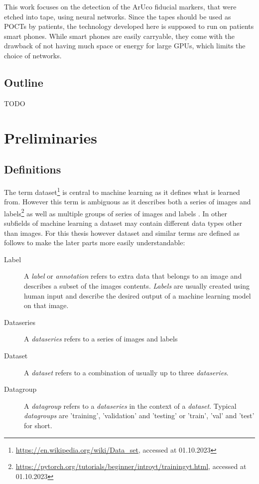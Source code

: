 \documentclass[10pt]{book}
\begin{document}
This work focuses on the detection of the \ac{ArUco} fiducial markers, that were etched into tape, using neural networks. Since the tapes should be used as \acp{POCT} by patients, the technology developed here is supposed to run on patients smart phones. While smart phones are easily carryable, they come with the drawback of not having much space or energy for large \acp{GPU}, which limits the choice of networks.

\section{Outline}

TODO

\chapter{Preliminaries}
\label{chap:prelim}

\section{Definitions}

The term dataset\footnote{\url{https://en.wikipedia.org/wiki/Data_set}, accessed at 01.10.2023} is central to machine learning as it defines what is learned from. However this term is ambiguous as it describes both a series of images and labels\footnote{\url{https://pytorch.org/tutorials/beginner/introyt/trainingyt.html}, accessed at 01.10.2023} as well as multiple groups of series of images and labels \cite{lin2014microsoft}. In other subfields of machine learning a dataset may contain different data types other than images. For this thesis however dataset and similar terms are defined as follows to make the later parts more easily understandable:

\begin{description}
  \item[Label] A \textit{label} or \textit{annotation} refers to extra data that belongs to an image and describes a subset of the images contents. \textit{Labels} are usually created using human input and describe the desired output of a machine learning model on that image.
  \item[Dataseries] A \textit{dataseries} refers to a series of images and labels
  \item[Dataset] A \textit{dataset} refers to a combination of usually up to three \textit{dataseries}.
  \item[Datagroup] A \textit{datagroup} refers to a \textit{dataseries} in the context of a \textit{dataset}. Typical \textit{datagroups} are 'training', 'validation' and 'testing' or 'train', 'val' and 'test' for short.
\end{description}
\end{document}
